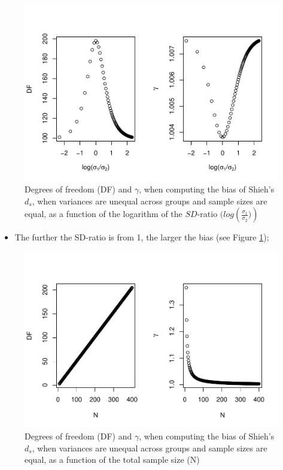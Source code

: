 \documentclass[
  man]{apa6}
\providecommand{\tightlist}{%
  \setlength{\itemsep}{0pt}\setlength{\parskip}{0pt}}
\begin{document}
\begin{figure}
\centering
\includegraphics{Theoretical-Bias-of-all-estimators-as-a-function-of-population-parameters_files/figure-latex/biasshiehhetbalSDratio2-1.pdf}
\caption{\label{fig:biasshiehhetbalSDratio2}Degrees of freedom (DF) and \(\gamma\), when computing the bias of Shieh's \(d_s\), when variances are unequal across groups and sample sizes are equal, as a function of the logarithm of the \(SD\)-ratio \((log \left(\frac{\sigma_1}{\sigma_2})\right)\)}
\end{figure}

\begin{itemize}
\tightlist
\item
  The further the SD-ratio is from 1, the larger the bias (see Figure \ref{fig:biasshiehhetbalSDratio2});
\end{itemize}

\begin{figure}
\centering
\includegraphics{Theoretical-Bias-of-all-estimators-as-a-function-of-population-parameters_files/figure-latex/biasshiehhetbalNsize2-1.pdf}
\caption{\label{fig:biasshiehhetbalNsize2}Degrees of freedom (DF) and \(\gamma\), when computing the bias of Shieh's \(d_s\), when variances are unequal across groups and sample sizes are equal, as a function of the total sample size (N)}
\end{figure}
\end{document}
